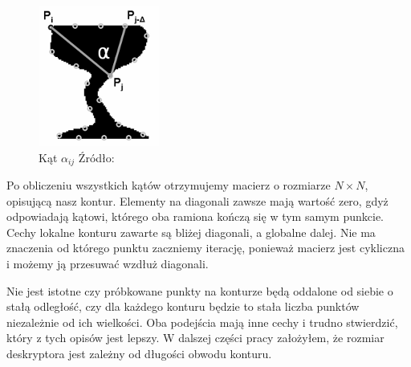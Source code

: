 \begin{figure}[h!] \centering
  \includegraphics[]{images/alpha.png}
  \caption{ Kąt $\alpha_{ij}$ Źródło: \cite{ismatch} } \end{figure}

Po obliczeniu wszystkich kątów otrzymujemy macierz o rozmiarze $N \times N$,
opisującą nasz kontur. Elementy na diagonali zawsze mają wartość zero, gdyż
odpowiadają kątowi, którego oba ramiona kończą się w tym samym punkcie. Cechy
lokalne konturu zawarte są bliżej diagonali, a globalne dalej. Nie ma znaczenia
od którego punktu zaczniemy iterację, ponieważ macierz jest cykliczna i możemy
ją przesuwać wzdłuż diagonali.

Nie jest istotne czy próbkowane punkty na konturze będą oddalone od siebie o
stałą odległość, czy dla każdego konturu będzie to stała liczba punktów
niezależnie od ich wielkości. Oba podejścia mają inne cechy i trudno
stwierdzić, który z tych opisów jest lepszy. W dalszej części pracy założyłem,
że rozmiar deskryptora jest zależny od długości obwodu konturu.

